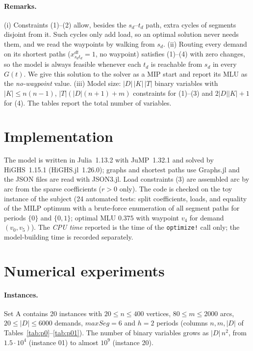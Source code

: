 \documentclass[11pt,a4paper]{article}
\begin{document}
\paragraph{Remarks.} (i) Constraints (1)--(2) allow, besides the $s_d$--$t_d$ path, extra cycles of
segments disjoint from it. Such cycles only add load, so an optimal solution never needs them, and we
read the waypoints by walking from $s_d$. (ii) Routing every demand on its shortest paths
($x^{dt}_{s_dt_d}=1$, no waypoint) satisfies (1)--(4) with zero changes, so the model is always feasible
whenever each $t_d$ is reachable from $s_d$ in every $G(t)$. We give this solution to the solver as a MIP start
and report its MLU as the \emph{no-waypoint} value.
(iii) Model size: $|D|\,|K|\,|T|$ binary variables with $|K|\le n(n-1)$, $|T|(|D|(n+1)+m)$ constraints for
(1)--(3) and $2|D||K|+1$ for (4). The tables report the total number of variables.

\section{Implementation}

The model is written in Julia~1.13.2 with JuMP~1.32.1 and solved by HiGHS~1.15.1 (HiGHS.jl~1.26.0);
graphs and shortest paths use Graphs.jl and the JSON files are read with JSON3.jl. Load constraints (3)
are assembled arc by arc from the sparse coefficients ($r>0$ only). The code is checked on the toy
instance of the subject (24 automated tests: split coefficients, loads, and equality of the MILP optimum
with a brute-force enumeration of all segment paths for periods $\{0\}$ and $\{0,1\}$; optimal MLU $0.375$
with waypoint $v_4$ for demand $(v_0,v_5)$). The \emph{CPU time} reported is the time of the
\texttt{optimize!} call only; the model-building time is recorded separately.

\section{Numerical experiments}

\paragraph{Instances.} Set A contains 20 instances with $20\le n\le400$ vertices, $80\le m\le2000$ arcs,
$20\le|D|\le6000$ demands, $maxSeg=6$ and $h=2$ periods (columns $n,m,|D|$ of
Tables~\ref{tab:p0}--\ref{tab:p01}). The number of binary variables grows as $|D|\,n^2$, from $1.5\cdot10^4$
(instance 01) to almost $10^9$ (instance 20).
\end{document}

